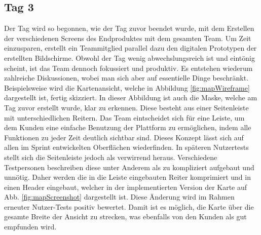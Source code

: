 \subsection*{\label{sec:Sprint-Umsetzung-Tag3}\thesubsection\quad Tag 3}Der Tag wird so begonnen, wie der Tag zuvor beendet wurde, mit dem Erstellen der verschiedenen Screens des Endproduktes mit dem gesamten Team. Um Zeit einzusparen, erstellt ein Teammitglied parallel dazu den digitalen Prototypen der erstellten Bildschirme. Obwohl der Tag wenig abwechslungsreich ist und eintönig scheint, ist das Team dennoch fokussiert und produktiv. Es entstehen wiederum zahlreiche Diskussionen, wobei man sich aber auf essentielle Dinge beschränkt. Beispielsweise wird die Kartenansicht, welche in Abbildung \ref{fig:mapWireframe} dargestellt ist, fertig skizziert. In dieser Abbildung ist auch die Maske, welche am Tag zuvor erstellt wurde, klar zu erkennen. Diese besteht aus einer Seitenleiste mit unterschiedlichen Reitern. Das Team eintscheidet sich für eine Leiste, um dem Kunden eine einfache Benutzung der Plattform zu ermöglichen, indem alle Funktionen zu jeder Zeit deutlich sichtbar sind. Dieses Konzept lässt sich auf allen im Sprint entwickelten Oberflächen wiederfinden. In späteren Nutzertests stellt sich die Seitenleiste jedoch als verwirrend heraus. Verschiedene Testpersonen beschreiben diese unter Anderem als zu kompliziert aufgebaut und unnötig. Daher werden die in die Leiste eingebauten Reiter komprimiert und in einen Header eingebaut, welcher in der implementierten Version der Karte auf Abb. \ref{fig:mapScreenshot} dargestellt ist. Diese Änderung wird im Rahmen erneuter Nutzer-Tests positiv bewertet. Damit ist es möglich, die Karte über die gesamte Breite der Ansicht zu strecken, was ebenfalls von den Kunden als gut empfunden wird.  

